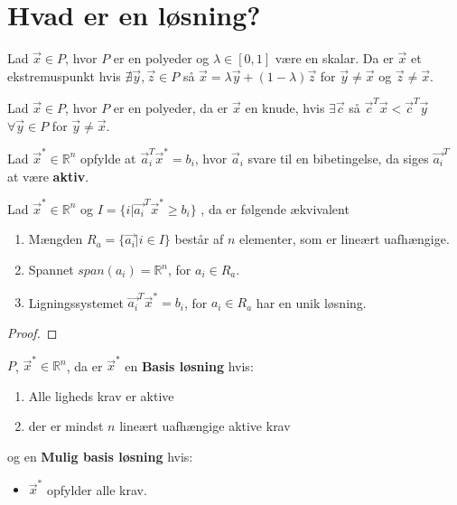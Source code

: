 \section{Hvad er en løsning?}


\begin{defn}[Ekstremuspunkt]
Lad $\vec{x} \in P$, hvor $P$ er en polyeder og $\lambda \in [0,1]$ være en skalar.
Da er $\vec{x}$ et ekstremuspunkt hvis $\nexists \vec{y}, \vec{z} \in P$ så $\vec{x} = \lambda \vec{y}+ (1- \lambda)\vec{z}$ for $\vec{y}\neq \vec{x}$ og $\vec{z}\neq \vec{x}$.
\end{defn}

\begin{defn}[Knude]
Lad $\vec{x} \in P$, hvor $P$ er en polyeder, da er $\vec{x}$ en knude, hvis $\exists \vec{c} $ så $\vec{c}^T \vec{x} < \vec{c}^T\vec{y}$ $\forall \vec{y} \in P$ for $\vec{y} \neq \vec{x}$.
\end{defn}


\begin{defn}
Lad $\vec{x}^* \in \mathds{R}^n$ opfylde at $\vec{a}_i^T\vec{x}^* = b_i$, hvor $\vec{a}_i$ svare til en bibetingelse, da siges $\vec{a_i}^T$ at være \textbf{aktiv}.
\end{defn}

\begin{stn}
Lad $\vec{x}^* \in \mathds{R}^n$ og $I = \{i | \vec{a_i}^T \vec{x}^*\geq b_i\}$ , da er følgende ækvivalent
\begin{enumerate}[label=(\alph*)]
\item Mængden $R_a =\{\vec{a_i}| i\in I\}$ består af $n$ elementer, som er lineært uafhængige.
\item Spannet $span(a_i) = \mathds{R}^n$, for $a_i \in R_a$.
\item Ligningssystemet $\vec{a_i}^T \vec{x}^* = b_i$, for $a_i \in R_a$ har en unik løsning.
\end{enumerate}
\end{stn}

\begin{proof}



\end{proof}





\begin{defn}
$P$, $\vec{x}^*\in \mathds{R}^n$, da er $\vec{x}^*$ en \textbf{Basis løsning} hvis:
\begin{enumerate}[label=(\alph*)]
\item Alle ligheds krav er aktive
\item der er mindst $n$ lineært uafhængige aktive krav
\end{enumerate}
og en \textbf{Mulig basis løsning} hvis:
\begin{itemize}
\item $\vec{x}^*$ opfylder alle krav.
\end{itemize}
\end{defn}


